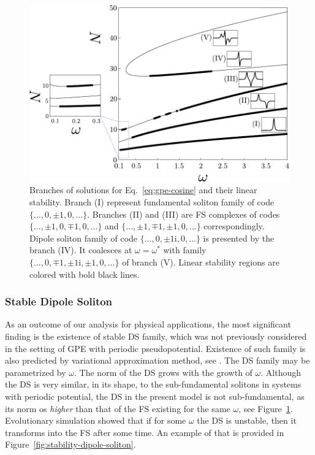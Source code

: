 \begin{figure}[h]
\centering
	\includegraphics[scale = 1]{pic/branches for cosine equation}
	\caption{
		Branches of solutions for Eq.~\eqref{eq:gpe-cosine} and their linear stability.
		Branch (I) represent fundamental soliton family of code $\{ \dots, 0, \pm 1, 0, \dots \}$.
		Branches (II) and (III) are FS complexes of codes $\{ \dots, \pm 1, 0, \mp 1, 0, \dots \}$ and $\{ \dots, \pm 1, \mp 1, \pm 1, 0, \dots \}$ correspondingly.
		Dipole soliton family of code $\{ \dots, 0, \pm 1\mathrm{i}, 0, \dots \}$ is presented by the branch (IV).
		It coalesces at $\omega = \omega^*$ with family $\{ \dots, 0, \mp 1, \pm 1\mathrm{i}, \pm 1, 0, \dots \}$ of branch (V).
		Linear stability regions are colored with bold black lines.
	}
\label{fig:branches-with-stability}
\end{figure}

\subsubsection{Stable Dipole Soliton}

As an outcome of our analysis for physical applications, the most significant finding is the existence of stable DS family, which was not previously considered in the setting of GPE with periodic pseudopotential.
Existence of such family is also predicted by variational approximation method, see \cite{LebedevAlfimovMalomed}.
The DS family may be parametrized by $\omega$.
The norm of the DS grows with the growth of $\omega$.
Although the DS is very similar, in its shape, to the sub-fundamental solitons in systems with periodic potential, the DS in the present model is not sub-fundamental, as its norm os {\it higher} than that of the FS existing for the same $\omega$, see Figure~\ref{fig:branches-with-stability}.
Evolutionary simulation showed that if for some $\omega$ the DS is unstable, then it transforms into the FS after some time.
An example of that is provided in Figure~\ref{fig:stability-dipole-soliton}.

